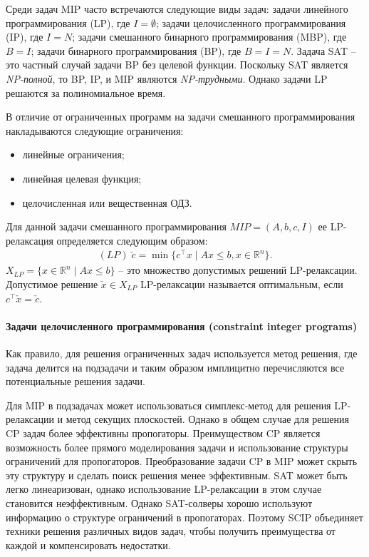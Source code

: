 \documentclass[%
	11pt,
	a4paper,
	utf8,
		]{article}
\begin{document}
Среди задач MIP часто встречаются следующие виды задач: задачи линейного программирования (LP), где $I=\emptyset$; задачи целочисленного программирования (IP), где $I=N$; задачи смешанного бинарного программирования (MBP), где $B=I$; задачи бинарного программирования (BP), где $B=I=N$. Задача SAT -- это частный случай задачи BP без целевой функции. Поскольку SAT является \emph{NP-полной}, то  BP, IP, и MIP являются \emph{NP-трудными}. Однако задачи LP решаются за полиномиальное время. 

В отличие от ограниченных программ на задачи смешанного программирования накладываются следующие ограничения:
\begin{itemize}
	\item линейные ограничения;
	
	\item линейная целевая функция;
	
	\item целочисленная или вещественная ОДЗ.
\end{itemize}

\begin{definition}
	Для данной задачи смешанного программирования $MIP=(A,b,c,I)$ ее LP-релаксация определяется следующим образом:
	\begin{align*}
		(LP)\; \check{c}=\min\{c^{\intercal}x\mid Ax\le b, x\in\mathbb{R}^{n}\}.
	\end{align*}
	$X_{LP} = \{x\in\mathbb{R}^{n}\mid Ax\le b\}$ -- это множество допустимых решений LP-релаксации. Допустимое решение $\check{x}\in X_{LP}$ LP-релаксации называется оптимальным, если $c^{\intercal}\check{x}=\check{c}$.
\end{definition}

\paragraph{Задачи целочисленного программирования (constraint integer programs)}

Как правило, для решения ограниченных задач используется метод решения, где задача делится на подзадачи и таким образом имплицитно перечисляются все потенциальные решения задачи. 

Для MIP в подзадачах может использоваться симплекс-метод для решения LP-релаксации и метод секущих плоскостей. Однако в общем случае для решения CP задач более эффективны пропогаторы. Преимуществом CP является возможность более прямого моделирования задачи и использование структуры ограничений для пропогаторов. Преобразование задачи CP в MIP может скрыть эту структуру и сделать поиск решения менее эффективным. SAT может быть легко линеаризован, однако использование LP-релаксации в этом случае становится неэффективным. Однако SAT-солверы хорошо используют информацию о структуре ограничений в пропогаторах. Поэтому SCIP объединяет техники решения различных видов задач, чтобы получить преимущества от каждой и компенсировать недостатки. 
\end{document}
